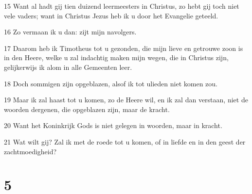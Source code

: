 \par 15 Want al hadt gij tien duizend leermeesters in Christus, zo hebt gij toch niet vele vaders; want in Christus Jezus heb ik u door het Evangelie geteeld.
\par 16 Zo vermaan ik u dan: zijt mijn navolgers.
\par 17 Daarom heb ik Timotheus tot u gezonden, die mijn lieve en getrouwe zoon is in den Heere, welke u zal indachtig maken mijn wegen, die in Christus zijn, gelijkerwijs ik alom in alle Gemeenten leer.
\par 18 Doch sommigen zijn opgeblazen, alsof ik tot ulieden niet komen zou.
\par 19 Maar ik zal haast tot u komen, zo de Heere wil, en ik zal dan verstaan, niet de woorden dergenen, die opgeblazen zijn, maar de kracht.
\par 20 Want het Koninkrijk Gods is niet gelegen in woorden, maar in kracht.
\par 21 Wat wilt gij? Zal ik met de roede tot u komen, of in liefde en in den geest der zachtmoedigheid?

\chapter{5}

